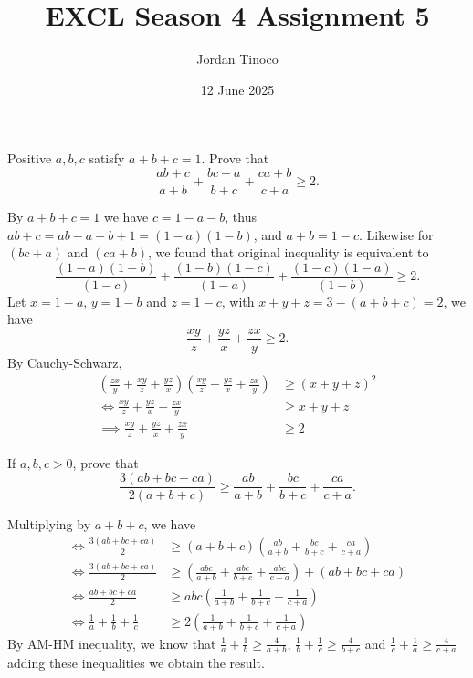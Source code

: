 \documentclass[12pt, paper=letter]{scrartcl}
\title {\Large EXCL Season 4 Assignment 5}
\date{12 June 2025}
\author{Jordan Tinoco}
\begin{document}
    \maketitle

    \begin{problem-wos}
        Positive $a,b,c$ satisfy $a + b + c = 1$.
        Prove that
        \[
            \frac{ab + c}{a + b} + \frac{bc + a}{b + c} + \frac{ca + b}{c + a} \geq 2.
        \]
    \end{problem-wos}
    \begin{solution}
        By $a + b + c = 1$ we have $c = 1 - a - b$, thus $ab + c = ab - a - b + 1 = (1 - a)(1 - b)$, and $a + b = 1 - c$.
        Likewise for $(bc + a)$ and $(ca + b)$, we found that original inequality is equivalent to
        \[
            \frac{(1 - a)(1 - b)}{(1 - c)} + \frac{(1 - b)(1 - c)}{(1 - a)} + \frac{(1 - c)(1 - a)}{(1 - b)} \geq 2.
        \]
        Let $x = 1 - a$, $y = 1 - b$ and $z = 1 - c$, with $x + y + z = 3 - (a + b + c) = 2$, we have
        \[
            \frac{xy}{z} + \frac{yz}{x} + \frac{zx}{y} \geq 2.
        \]
        By Cauchy-Schwarz,
        \begin{align*}
            \left(\frac{zx}{y} + \frac{xy}{z} + \frac{yz}{x}\right)\left(\frac{xy}{z} + \frac{yz}{x} + \frac{zx}{y}\right) &\geq (x + y + z)^2\\[3mm]
            \iff \frac{xy}{z} + \frac{yz}{x} + \frac{zx}{y} &\geq x + y + z\\[2mm]
            \implies \frac{xy}{z} + \frac{yz}{x} + \frac{zx}{y} &\geq 2
        \end{align*}\qedhere
    \end{solution}

    \begin{problem-wos}
        If $a,b,c > 0$, prove that
        \[
            \frac{3(ab + bc + ca)}{2(a + b + c)} \geq \frac{ab}{a + b} + \frac{bc}{b + c} + \frac{ca}{c + a}.
        \]
    \end{problem-wos}
    \begin{solution}
        Multiplying by $a + b + c$, we have
        \begin{align*}
            \iff \frac{3(ab + bc + ca)}{2} &\geq (a + b + c)\left(\frac{ab}{a + b} + \frac{bc}{b + c} + \frac{ca}{c + a}\right)\\[3mm]
            \iff \frac{3(ab + bc + ca)}{2} &\geq \left(\frac{abc}{a + b} + \frac{abc}{b + c} + \frac{abc}{c + a}\right) + (ab + bc + ca)\\[3mm]
            \iff \frac{ab + bc + ca}{2} &\geq abc\left(\frac{1}{a + b} + \frac{1}{b + c} + \frac{1}{c + a}\right)\\[3mm]
            \iff \frac{1}{a} + \frac{1}{b} + \frac{1}{c} &\geq 2\left(\frac{1}{a + b} + \frac{1}{b + c} + \frac{1}{c + a}\right)
        \end{align*}
        By AM-HM inequality, we know that $\frac{1}{a} + \frac{1}{b} \geq \frac{4}{a + b}$, $\frac{1}{b} + \frac{1}{c} \geq \frac{4}{b + c}$ and $\frac{1}{c} + \frac{1}{a} \geq \frac{4}{c + a}$ adding these inequalities we obtain the result.
    \end{solution}
    
\end{document}
